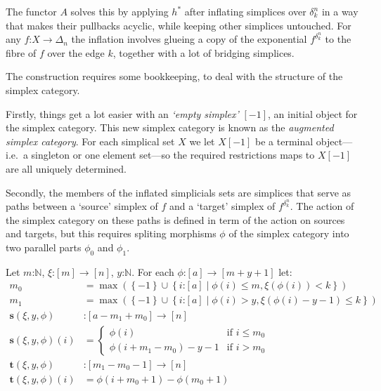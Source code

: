 \documentclass{tac}
\newcommand\hide[1]{}
\newcommand\of{\mathord:}
\newcommand\set[1]{\left\{#1\right\}}
\newcommand\nno{\mathbb{N}}
\newcommand\ri{^*}
\begin{document}
The functor \( A \) solves this by applying \( h\ri \) after inflating simplices over 
\( \delta^n_k \) in a way that makes their pullbacks acyclic, while keeping other
simplices untouched. For any \( f\of X\to \Delta_n \) the inflation involves glueing
a copy of the exponential \( f^{\delta^n_k} \) to the fibre of \( f \) over the edge 
\( k \), together with a lot of bridging simplices.

The construction requires some bookkeeping, to deal with the structure of the
simplex category. \hide{simplex category?}

Firstly, things get a lot easier with an \emph{`empty simplex'} \( [-1] \), an 
initial object for the simplex category. This new simplex category is known as 
the \emph{augmented simplex category}. For each simplical set \( X \) we let 
\( X[-1] \) be a terminal object---i.e.\ a singleton or one element set---so the 
required restrictions maps to \( X[-1] \) are all uniquely determined.

Secondly, the members of the inflated simplicials sets are simplices that
serve as paths between a `source' simplex of \( f \) and a `target' simplex of 
\( f^{\delta^n_k} \). The action of the simplex category on these paths
is defined in term of the action on sources and targets, but this requires
spliting morphisms \( \phi \) of the simplex category into two parallel parts
\( \phi_0 \) and \( \phi_1 \).

\newcommand\source{\mathbf{s}}
\newcommand\target{\mathbf{t}}
Let \( m\of\nno \), \( \xi\of[m]\to[n] \), \( y\of \nno \). For 
each \( \phi\of[a]\to[m + y + 1] \) let:
\begin{align}
  \label{max0} m_0 &= \max(\set{-1}\cup\set{i\of[a]\middle|
    \phi(i)\leq m, \xi(\phi(i)) < k
  })\\
  \label{max1} m_1 &= \max(\set{-1}\cup\set{i\of[a]\middle|
    \phi(i) > y, \xi(\phi(i)-y-1)\leq k
  })\\
  \label{source0} \source(\xi, y, \phi)&\of
    [a - m_1 + m_0]\to[n]\\
  \label{source1} \source(\xi, y, \phi)(i)&= 
    \left\{
      \begin{array}{rl}
        \phi(i) &\textrm{if } i \leq m_0 \\
        \phi(i + m_1 - m_0) - y - 1 &\textrm{if } i > m_0
      \end{array}
    \right. \\
  \target(\xi, y, \phi)&\of\label{target0} 
    [m_1 - m_0 - 1]\to[n]\\
  \target(\xi, y, \phi)(i) &=\label{target1} 
    \phi(i + m_0 + 1) - \phi(m_0 + 1)
\end{align}
\end{document}
